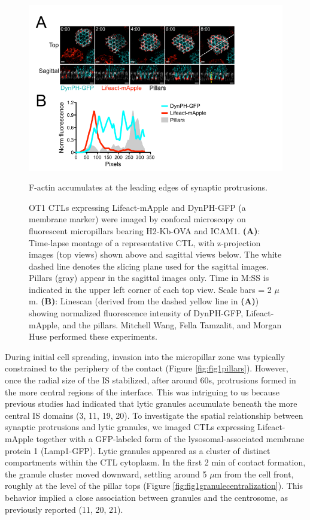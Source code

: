 \begin{figure}[htbp]
	\centering
	\includegraphics[width=\textwidth]{../figures/chapter2/fig1actinleadingedge.png}
	\caption{F-actin accumulates at the leading edges of synaptic protrusions.}
	\caption*{OT1 CTLs expressing Lifeact-mApple and DynPH-GFP (a membrane marker) were imaged by confocal microscopy on fluorescent micropillars bearing H2-Kb-OVA and ICAM1. \textbf{(A)}: Time-lapse montage of a representative CTL, with z-projection images (top views) shown above and sagittal views below. The white dashed line denotes the slicing plane used for the sagittal images. Pillars (gray) appear in the sagittal images only. Time in M:SS is indicated in the upper left corner of each top view. Scale bars = 2 $\mu$m. \textbf{(B)}: Linescan (derived from the dashed yellow line in \textbf{(A)}) showing normalized fluorescence intensity of DynPH-GFP, Lifeact-mApple, and the pillars. Mitchell Wang, Fella Tamzalit, and Morgan Huse performed these experiments.}
	\label{fig:fig1actinleadingedge}
\end{figure}

During initial cell spreading, invasion into the micropillar zone was typically constrained to the periphery of the contact (Figure \ref{fig:fig1pillars}). However, once the radial size of the IS stabilized, after around 60s, protrusions formed in the more central regions of the interface. This was intriguing to us because previous studies had indicated that lytic granules accumulate beneath the more central IS domains (3, 11, 19, 20). To investigate the spatial relationship between synaptic protrusions and lytic granules, we imaged CTLs expressing Lifeact-mApple together with a GFP-labeled form of the lysosomal-associated membrane protein 1 (Lamp1-GFP). Lytic granules appeared as a cluster of distinct compartments within the CTL cytoplasm. In the first 2 min of contact formation, the granule cluster moved downward, settling around 5 $\mu$m from the cell front, roughly at the level of the pillar tops (Figure \ref{fig:fig1granulecentralization}). This behavior implied a close association between granules and the centrosome, as previously reported (11, 20, 21).

